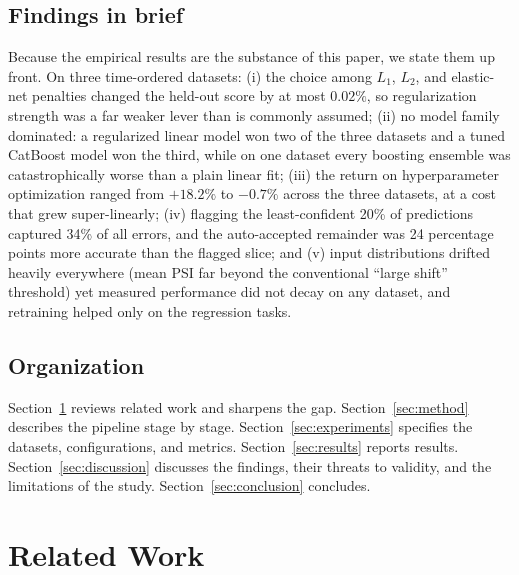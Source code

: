 \documentclass{ieeeaccess}
\begin{document}
\subsection{Findings in brief}
Because the empirical results are the substance of this paper, we state them up front. On three time-ordered datasets: (i) the choice among $L_1$, $L_2$, and elastic-net penalties changed the held-out score by at most $0.02\%$, so regularization strength was a far weaker lever than is commonly assumed; (ii) no model family dominated: a regularized linear model won two of the three datasets and a tuned CatBoost model won the third, while on one dataset every boosting ensemble was catastrophically worse than a plain linear fit; (iii) the return on hyperparameter optimization ranged from $+18.2\%$ to $-0.7\%$ across the three datasets, at a cost that grew super-linearly; (iv) flagging the least-confident 20\% of predictions captured 34\% of all errors, and the auto-accepted remainder was 24 percentage points more accurate than the flagged slice; and (v) input distributions drifted heavily everywhere (mean PSI far beyond the conventional ``large shift'' threshold) yet measured performance did not decay on any dataset, and retraining helped only on the regression tasks.

\subsection{Organization}
Section~\ref{sec:related} reviews related work and sharpens the gap. Section~\ref{sec:method} describes the pipeline stage by stage. Section~\ref{sec:experiments} specifies the datasets, configurations, and metrics. Section~\ref{sec:results} reports results. Section~\ref{sec:discussion} discusses the findings, their threats to validity, and the limitations of the study. Section~\ref{sec:conclusion} concludes.

\section{Related Work}
\label{sec:related}
\end{document}
